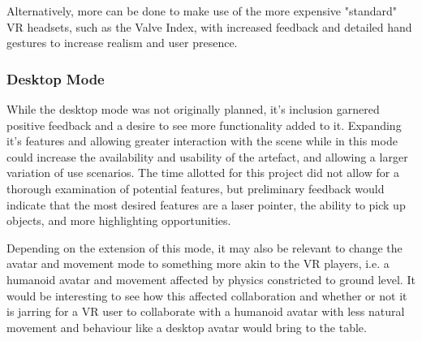 Alternatively, more can be done to make use of the more expensive "standard" VR headsets, such as the Valve Index, with increased feedback and detailed hand gestures to increase realism and user presence.

\subsubsection{Desktop Mode}
While the desktop mode was not originally planned, it's inclusion garnered positive feedback and a desire to see more functionality added to it. Expanding it's features and allowing greater interaction with the scene while in this mode could increase the availability and usability of the artefact, and allowing a larger variation of use scenarios. The time allotted for this project did not allow for a thorough examination of potential features, but preliminary feedback would indicate that the most desired features are a laser pointer, the ability to pick up objects, and more highlighting opportunities.

Depending on the extension of this mode, it may also be relevant to change the avatar and movement mode to something more akin to the VR players, i.e. a humanoid avatar and movement affected by physics constricted to ground level. It would be interesting to see how this affected collaboration and whether or not it is jarring for a VR user to collaborate with a humanoid avatar with less natural movement and behaviour like a desktop avatar would bring to the table.


\cleardoublepage
